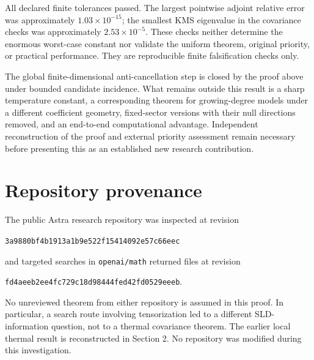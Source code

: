 \documentclass[11pt]{article}
\theoremstyle{remark}\newtheorem{remark}[theorem]{Remark}
\begin{document}
All declared finite tolerances passed. The largest pointwise adjoint relative error was approximately $1.03\times10^{-15}$; the smallest KMS eigenvalue in the covariance checks was approximately $2.53\times10^{-5}$. These checks neither determine the enormous worst-case constant nor validate the uniform theorem, original priority, or practical performance. They are reproducible finite falsification checks only.

The global finite-dimensional anti-cancellation step is closed by the proof above under bounded candidate incidence. What remains outside this result is a sharp temperature constant, a corresponding theorem for growing-degree models under a different coefficient geometry, fixed-sector versions with their null directions removed, and an end-to-end computational advantage. Independent reconstruction of the proof and external priority assessment remain necessary before presenting this as an established new research contribution.

\appendix
\section{Repository provenance}
The public Astra research repository was inspected at revision
\begin{center}\small\texttt{3a9880bf4b1913a1b9e522f15414092e57c66eec}\end{center}
and targeted searches in \texttt{openai/math} returned files at revision
\begin{center}\small\texttt{fd4aeeb2ee4fc729c18d98444fed42fd0529eeeb}.\end{center}
No unreviewed theorem from either repository is assumed in this proof. In particular, a search route involving tensorization led to a different SLD-information question, not to a thermal covariance theorem. The earlier local thermal result is reconstructed in Section 2. No repository was modified during this investigation.
\end{document}
